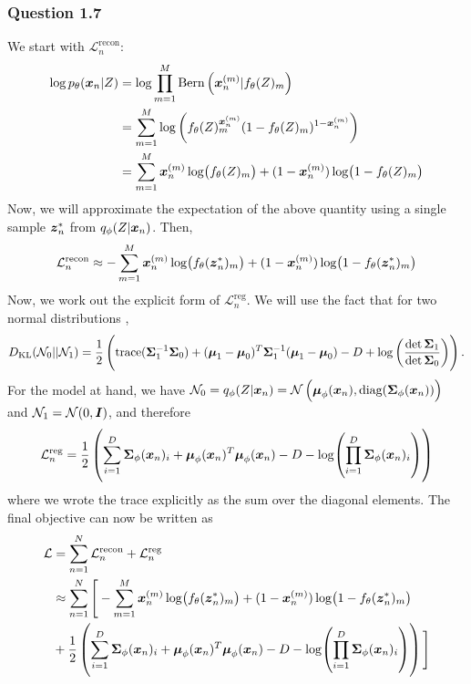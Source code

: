 \documentclass{article}
\begin{document}
\subsubsection*{Question 1.7}
We start with $\mathcal{L}^{\text{recon}}_n$:
$$
\begin{aligned}
\log p_\theta(\boldsymbol{x}_n | Z) &= \log \prod_{m=1}^{M}\text{Bern}\left(\boldsymbol{x}_n^{(m)} | f_\theta(Z)_m\right) \\ &= \sum_{m=1}^{M}\log\left(f_\theta(Z)_m^{\boldsymbol{x}_n^{(m)}}(1 - f_\theta(Z)_m)^{1 - \boldsymbol{x}_n^{(m)}}\right) \\ &= \sum_{m=1}^M \boldsymbol{x}_n^{(m)}\log(f_\theta(Z)_m) + (1 - \boldsymbol{x}_n^{(m)})\log(1 - f_\theta(Z)_m)
\end{aligned}
$$
Now, we will approximate the expectation of the above quantity using a single sample $\boldsymbol{z}^*_n$ from $q_\phi(Z | \boldsymbol{x}_n)$. Then, 
$$
\mathcal{L}^{\text{recon}}_n \approx - \sum_{m=1}^M \boldsymbol{x}_n^{(m)}\log(f_\theta(\boldsymbol{z}^*_n)_m) + (1 - \boldsymbol{x}_n^{(m)})\log(1 - f_\theta(\boldsymbol{z}^*_n)_m)
$$
Now, we work out the explicit form of $\mathcal{L}^{\text{reg}}_n$. We will use the fact that for two normal distributions \cite{doersch2016tutorial}, 
$$
D_{\text{KL}}(\mathcal{N}_0 || \mathcal{N}_1) = \frac{1}{2}\left(\text{trace}(\boldsymbol{\Sigma}_1^{-1}\boldsymbol{\Sigma}_0) + (\boldsymbol{\mu}_1 - \boldsymbol{\mu}_0)^T\boldsymbol{\Sigma}_1^{-1}(\boldsymbol{\mu}_1 - \boldsymbol{\mu}_0) - D + \log\left(\frac{\det\boldsymbol{\Sigma}_1}{\det\boldsymbol{\Sigma}_0}\right)\right).
$$ For the model at hand, we have $\mathcal{N}_0 = q_\phi(Z | \boldsymbol{x}_n) = \mathcal{N}\left(\boldsymbol{\mu}_\phi(\boldsymbol{x}_n), \text{diag}(\boldsymbol{\Sigma}_\phi(\boldsymbol{x}_n))\right)$ and $\mathcal{N}_1 = \mathcal{N}(0, \boldsymbol{I})$, and therefore
$$
\begin{aligned}
\mathcal{L}^{\text{reg}}_n = \frac{1}{2}\left(\sum_{i = 1}^D\boldsymbol{\Sigma}_\phi(\boldsymbol{x}_n)_i + \boldsymbol{\mu}_\phi(\boldsymbol{x}_n)^T \boldsymbol{\mu}_\phi(\boldsymbol{x}_n) - D - \log(\prod_{i=1}^{D}\boldsymbol{\Sigma}_\phi(\boldsymbol{x}_n)_i)\right)
\end{aligned}
$$ where we wrote the trace explicitly as the sum over the diagonal elements. The final objective can now be written as
$$
\begin{aligned}
\mathcal{L} &= \sum_{n=1}^{N} \mathcal{L}^{\text{recon}}_n + \mathcal{L}^{\text{reg}}_n \\ &\approx \sum_{n=1}^N \Bigg[ - \sum_{m=1}^M \boldsymbol{x}_n^{(m)}\log(f_\theta(\boldsymbol{z}^*_n)_m) + (1 - \boldsymbol{x}_n^{(m)})\log(1 - f_\theta(\boldsymbol{z}^*_n)_m) \\ &+ \frac{1}{2}\left(\sum_{i = 1}^D\boldsymbol{\Sigma}_\phi(\boldsymbol{x}_n)_i + \boldsymbol{\mu}_\phi(\boldsymbol{x}_n)^T \boldsymbol{\mu}_\phi(\boldsymbol{x}_n) - D - \log(\prod_{i=1}^{D}\boldsymbol{\Sigma}_\phi(\boldsymbol{x}_n)_i)\right)\Bigg]
\end{aligned}
$$
\end{document}
